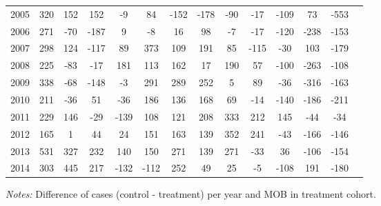 \begin{table}[H]
\begin{threeparttable}
{\begin{tabular}{l*{13}{c}}
2005        &         320&         152&         152&          -9&          84&        -152&        -178&         -90&         -17&        -109&          73&        -553\\
2006        &         271&         -70&        -187&           9&          -8&          16&          98&          -7&         -17&        -120&        -238&        -153\\
2007        &         298&         124&        -117&          89&         373&         109&         191&          85&        -115&         -30&         103&        -179\\
2008        &         225&         -83&         -17&         181&         113&         162&          17&         190&          57&        -100&        -263&        -108\\
2009        &         338&         -68&        -148&          -3&         291&         289&         252&           5&          89&         -36&        -316&        -163\\
2010        &         211&         -36&          51&         -36&         186&         136&         168&          69&         -14&        -140&        -186&        -211\\
2011        &         229&         146&         -29&        -139&         108&         121&         208&         333&         212&         145&         -44&         -34\\
2012        &         165&           1&          44&          24&         151&         163&         139&         352&         241&         -43&        -166&        -146\\
2013        &         531&         327&         232&         140&         150&         271&         139&         271&         -33&          36&        -106&        -154\\
2014        &         303&         445&         217&        -132&        -112&         252&          49&          25&          -5&        -108&         191&        -180\\
 \bottomrule \end{tabular} } \begin{tablenotes} \item \scriptsize \emph{Notes:} Difference of cases (control - treatment) per year and MOB in treatment cohort. \end{tablenotes} \end{threeparttable} \end{table} 
